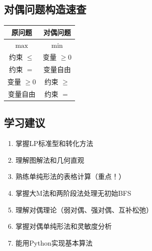 \subsection{对偶问题构造速查}

\begin{table}[H]
\centering
\begin{tabular}{@{}cc@{}}
\toprule
\textbf{原问题} & \textbf{对偶问题} \\
\midrule
$\max$ & $\min$ \\
约束 $\leq$ & 变量 $\geq 0$ \\
约束 $=$ & 变量自由 \\
变量 $\geq 0$ & 约束 $\geq$ \\
变量自由 & 约束 $=$ \\
\bottomrule
\end{tabular}
\end{table}

\subsection{学习建议}

\begin{notebox}[LP学习路径]
\begin{enumerate}
    \item 掌握LP标准型和转化方法
    \item 理解图解法和几何直观
    \item 熟练单纯形法的表格计算（重点！）
    \item 掌握大M法和两阶段法处理无初始BFS
    \item 理解对偶理论（弱对偶、强对偶、互补松弛）
    \item 掌握对偶单纯形法和灵敏度分析
    \item 能用Python实现基本算法
\end{enumerate}
\end{notebox}

\newpage

